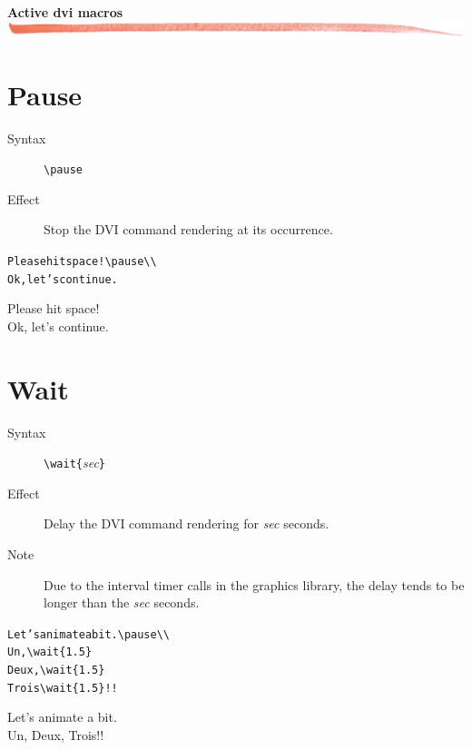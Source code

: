 \documentclass{article}
\begin{document}
\noindent
{\bf\Large Active dvi macros}\\

\noindent
\includegraphics[width=\textwidth]{../tex/bar.jpg.eps}

\section{Pause}

\begin{description}
\item[Syntax]  \verb!\pause!
\item[Effect] Stop the DVI command rendering at its occurrence.
\end{description}

\begin{minipage}[t]{0.5\textwidth}
\begin{alltt}
Please hit space!{\color{blue}\verb!\!pause}\verb!\\!
Ok, let's continue.
\end{alltt}
\end{minipage}
\begin{minipage}[t]{0.5\textwidth}
Please hit space!\\ \pause Ok, let's continue.
\end{minipage}

\section{Wait}

\begin{description}
\item[Syntax]  \verb!\wait{!{\em{sec}}\verb!}!
\item[Effect] Delay the DVI command rendering for {\em{sec}} seconds.
\item[Note] Due to the interval timer calls in the graphics library,
  the delay tends to be longer than the {\em{sec}} seconds.
\end{description}

\begin{minipage}[t]{0.5\textwidth}
\begin{alltt}
Let's animate a bit.\verb!\pause\\!
Un,{\color{blue}\verb!\wait{1.5}!}
Deux,{\color{blue}\verb!\wait{1.5}!}
Trois{\color{blue}\verb!\wait{1.5}!}!! 
\end{alltt}
\end{minipage}
\begin{minipage}[t]{0.5\textwidth}
Let's animate a bit.\pause\\
Un,
Deux,
Trois!! 
\end{minipage}
\end{document}
